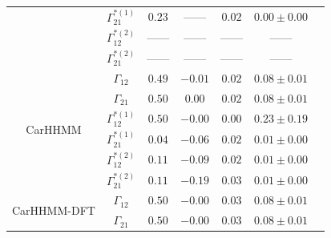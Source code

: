 \begin{table}[t]
{\begin{tabular}{ccccccc}
                             & $\Gamma^{*(1)}_{21}$          & $0.23$                         & ------                   & $0.02$                           & $0.00 \pm 0.00$                             \\
                             & $\Gamma^{*(2)}_{12}$          & ------                         & ------                   & ------                           & ------                                      \\
                             & $\Gamma^{*(2)}_{21}$          & ------                         & ------                   & ------                           & ------                                      \\ \hline
\multirow{6}{*}{CarHHMM}     & $\Gamma_{12}$                 & $0.49$                         & $-0.01$                   & $0.02$                           & $0.08 \pm 0.01$                             \\
                             & $\Gamma_{21}$                 & $0.50$                         & $0.00$                   & $0.02$                           & $0.08 \pm 0.01$                             \\
                             & $\Gamma^{*(1)}_{12}$          & $0.50$                         & $-0.00$                   & $0.00$                           & $0.23 \pm 0.19$                             \\
                             & $\Gamma^{*(1)}_{21}$          & $0.04$                         & $-0.06$                   & $0.02$                           & $0.01 \pm 0.00$                             \\
                             & $\Gamma^{*(2)}_{12}$          & $0.11$                         & $-0.09$                   & $0.02$                           & $0.01 \pm 0.00$                             \\
                             & $\Gamma^{*(2)}_{21}$          & $0.11$                         & $-0.19$                   & $0.03$                           & $0.01 \pm 0.00$                             \\ \hline
\multirow{6}{*}{CarHHMM-DFT} & $\Gamma_{12}$                 & $0.50$                         & $-0.00$                   & $0.03$                           & $0.08 \pm 0.01$                             \\
                             & $\Gamma_{21}$                 & $0.50$                         & $-0.00$                   & $0.03$                           & $0.08 \pm 0.01$                             \\

\end{tabular}}
\end{table}
